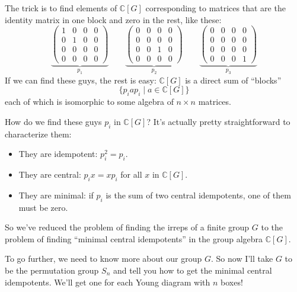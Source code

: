 \documentclass{article}
\def\tightlist{}
\begin{document}
The trick is to find elements of \(\mathbb{C}[G]\) corresponding to
matrices that are the identity matrix in one block and zero in the rest,
like these: \[
  \underbrace{
    \left(
      \begin{array}{cccc}
        1&0&0&0
      \\0&1&0&0
      \\0&0&0&0
      \\0&0&0&0
      \end{array}
    \right)}_{p_1}
  \qquad
  \underbrace{
    \left(
      \begin{array}{cccc}
        0&0&0&0
      \\0&0&0&0
      \\0&0&1&0
      \\0&0&0&0
      \end{array}
    \right)}_{p_2}
  \qquad
  \underbrace{
    \left(
      \begin{array}{cccc}
        0&0&0&0
      \\0&0&0&0
      \\0&0&0&0
      \\0&0&0&1
      \end{array}
    \right)}_{p_3}
\] If we can find these guys, the rest is easy: \(\mathbb{C}[G]\) is a
direct sum of ``blocks'' \[\{p_i a p_i \mid a \in\mathbb{C}[G]\}\] each
of which is isomorphic to some algebra of \(n\times n\) matrices.

How do we find these guys \(p_i\) in \(\mathbb{C}[G]\)? It's actually
pretty straightforward to characterize them:

\begin{itemize}
\tightlist
\item
  They are idempotent: \(p_i^2 = p_i\).
\item
  They are central: \(p_i x = x p_i\) for all \(x\) in
  \(\mathbb{C}[G]\).
\item
  They are minimal: if \(p_i\) is the sum of two central idempotents,
  one of them must be zero.
\end{itemize}

So we've reduced the problem of finding the irreps of a finite group
\(G\) to the problem of finding ``minimal central idempotents'' in the
group algebra \(\mathbb{C}[G]\).

To go further, we need to know more about our group \(G\). So now I'll
take \(G\) to be the permutation group \(S_n\) and tell you how to get
the minimal central idempotents. We'll get one for each Young diagram
with \(n\) boxes!
\end{document}
